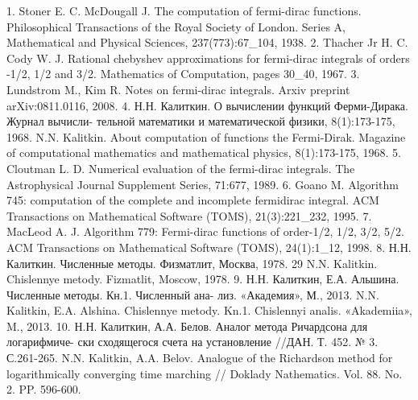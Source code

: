 1. Stoner E. C. McDougall J. The computation of fermi-dirac functions. Philosophical
Transactions of the Royal Society of London. Series A, Mathematical
and Physical Sciences, 237(773):67_104, 1938.
2. Thacher Jr H. C. Cody W. J. Rational chebyshev approximations for fermi-dirac
integrals of orders -1/2, 1/2 and 3/2. Mathematics of Computation, pages 30_40,
1967.
3. Lundstrom M., Kim R. Notes on fermi-dirac integrals. Arxiv preprint
arXiv:0811.0116, 2008.
4. Н.Н. Калиткин. О вычислении функций Ферми-Дирака. Журнал вычисли-
тельной математики и математической физики, 8(1):173-175, 1968.
N.N. Kalitkin. About computation of functions the Fermi-Dirak. Magazine of
computational mathematics and mathematical physics, 8(1):173-175, 1968.
5. Cloutman L. D. Numerical evaluation of the fermi-dirac integrals. The Astrophysical
Journal Supplement Series, 71:677, 1989.
6. Goano M. Algorithm 745: computation of the complete and incomplete fermidirac
integral. ACM Transactions on Mathematical Software (TOMS),
21(3):221_232, 1995.
7. MacLeod A. J. Algorithm 779: Fermi-dirac functions of order-1/2, 1/2, 3/2, 5/2.
ACM Transactions on Mathematical Software (TOMS), 24(1):1_12, 1998.
8. Н.Н. Калиткин. Численные методы. Физматлит, Москва, 1978.
29
N.N. Kalitkin. Chislennye metody. Fizmatlit, Moscow, 1978.
9. Н.Н. Калиткин, Е.А. Альшина. Численные методы. Кн.1. Численный ана-
лиз. «Академия», М., 2013.
N.N. Kalitkin, E.A. Alshina. Chislennye metody. Kn.1. Chislennyi analis.
«Akademiia», M., 2013.
10. Н.Н. Калиткин, А.А. Белов. Аналог метода Ричардсона для логарифмиче-
ски сходящегося счета на установление //ДАН. Т. 452. № 3. С.261-265.
N.N. Kalitkin, A.A. Belov. Analogue of the Richardson method for logarithmically
converging time marching // Doklady Nathematics. Vol. 88. No. 2. PP.
596-600.

